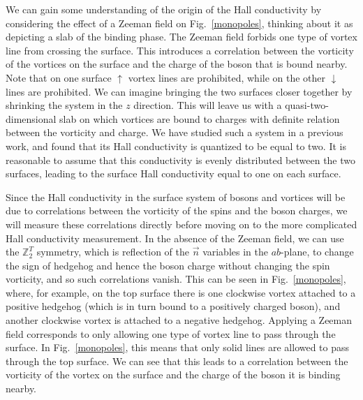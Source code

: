 \documentclass[prb,twocolumn]{revtex4-1}
\def\ztwot{\mathbb{Z}_2^T}
\begin{document}
We can gain some understanding of the origin of the Hall conductivity by considering the effect of a Zeeman field on Fig.~\ref{monopoles}, thinking about it as depicting a slab of the binding phase. The Zeeman field forbids one type of vortex line from crossing the surface. This introduces a correlation between the vorticity of the vortices on the surface and the charge of the boson that is bound nearby. Note that on one surface $\uparrow$ vortex lines are prohibited, while on the other $\downarrow$ lines are prohibited. We can imagine bringing the two surfaces closer together by shrinking the system in the $z$ direction. This will leave us with a quasi-two-dimensional slab on which vortices are bound to charges with definite relation between the vorticity and charge. We have studied such a system in a previous work,\cite{FQHE} and found that its Hall conductivity is quantized to be equal to two. It is reasonable to assume that this conductivity is evenly distributed between the two surfaces, leading to the surface Hall conductivity equal to one on each surface. 

Since the Hall conductivity in the surface system of bosons and vortices will be due to correlations between the vorticity of the spins and the boson charges,\cite{FQHE} we will measure these correlations directly before moving on to the more complicated Hall conductivity measurement. In the absence of the Zeeman field, we can use the $\ztwot$ symmetry, which is reflection of the $\vec n$ variables in the $ab$-plane, to change the sign of hedgehog and hence the boson charge without changing the spin vorticity, and so such correlations vanish. This can be seen in Fig.~\ref{monopoles}, where, for example, on the top surface there is one clockwise vortex attached to a positive hedgehog (which is in turn bound to a positively charged boson), and another clockwise vortex is attached to a negative hedgehog. Applying a Zeeman field corresponds to only allowing one type of vortex line to pass through the surface. In Fig.~\ref{monopoles}, this means that only solid lines are allowed to pass through the top surface. We can see that this leads to a correlation between the vorticity of the vortex on the surface and the charge of the boson it is binding nearby. 
\end{document}
